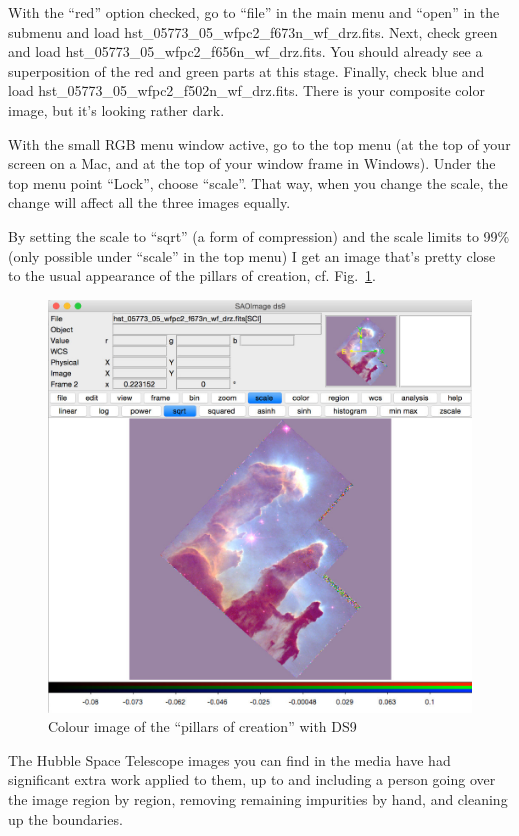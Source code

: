 \documentclass[twocolumn,apj]{openjournal}
\begin{document}
With the ``red'' option checked, go to ``file'' in the main menu and ``open'' in the submenu and load hst\_05773\_05\_wfpc2\_f673n\_wf\_drz.fits. Next, check green and load hst\_05773\_05\_wfpc2\_f656n\_wf\_drz.fits. You should already see a superposition of the red and green parts at this stage. Finally,  check blue and load hst\_05773\_05\_wfpc2\_f502n\_wf\_drz.fits. There is your composite color image, but it's looking rather dark. 

With the small RGB menu window active, go to the top menu (at the top of your screen on a Mac, and at the top of your window frame in Windows). Under the top menu point ``Lock'', choose ``scale''. That way,  when you change the scale, the change will affect all the three images equally. 

By setting the scale to ``sqrt'' (a form of compression) and the scale limits to 99\% (only possible under ``scale'' in the top menu) I get an image that's pretty close to the usual appearance of the pillars of creation, cf. Fig.~\ref{Pillars1}.
\begin{figure}[htbp]
\begin{center}
\includegraphics[width=\linewidth]{pillars-final.jpg}
\caption{Colour image of the ``pillars of creation'' with DS9}
\label{Pillars1}
\end{center}
\end{figure}
The Hubble Space Telescope images you can find in the media have had significant extra work applied to them, up to and including a person going over the image region by region, removing remaining impurities by hand, and cleaning up the boundaries.
\end{document}
